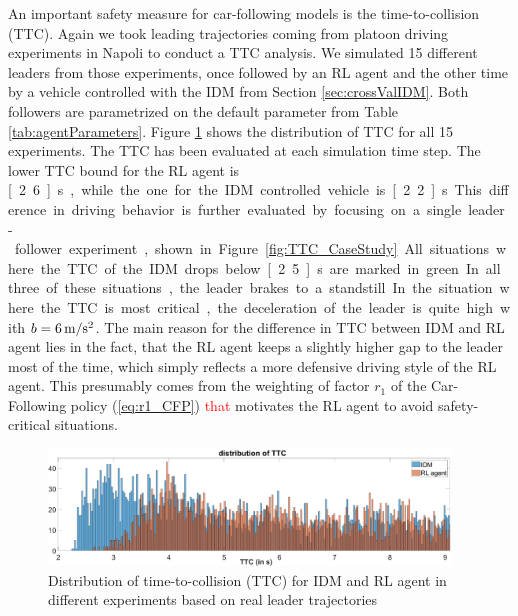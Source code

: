 \documentclass[review]{elsarticle}
\providecommand{\red}[1]{\textcolor{red}{#1}}
\providecommand{\martin}[1]{\red{#1}} %
\providecommand{\3}{{\ss}}
\begin{document}
An important safety measure for car-following models is the
time-to-collision (TTC). Again we took leading trajectories coming
from platoon driving experiments in Napoli to conduct a TTC
analysis. We simulated 15 different leaders from those experiments,
once followed by an RL agent and the other time by a vehicle
controlled with the IDM from Section \ref{sec:crossValIDM}. Both
followers are parametrized on the default parameter from Table
\ref{tab:agentParameters}. Figure \ref{fig:DistributionTTC} shows the
distribution of TTC for all 15 experiments. The TTC has been evaluated
at each simulation time step. The lower TTC bound for the RL agent is
\unit[2.6]{s}, while the one for the IDM controlled vehicle is
\unit[2.2]{s}. This difference in driving behavior is further
evaluated by focusing on a single leader-follower experiment, shown in
Figure \ref{fig:TTC_CaseStudy}. All situations where the TTC of the
IDM drops below \unit[2.5]{s} are marked in green. In all three of
these situations, the leader brakes to a standstill. In the situation
where the TTC is most critical, the deceleration of the leader is
quite high with $b = \unit[6]{m/s^2}$. The main reason for the
difference in TTC between IDM and RL agent lies in the fact, that the
RL agent keeps a slightly higher gap to the leader most of the time,
which simply reflects a more defensive driving style of the RL
agent. This presumably comes from the weighting of factor $r_1$  of
the Car-Following policy (\ref{eq:r1_CFP}) \martin{that} motivates the RL agent to avoid safety-critical situations. 

\begin{figure}	
	\centering
	\includegraphics[width=0.95\textwidth]{images/DistributionTTC}
	\caption{Distribution of time-to-collision (TTC) for IDM and RL agent in different experiments based on real leader trajectories}
	\label{fig:DistributionTTC}
\end{figure}
\end{document}
